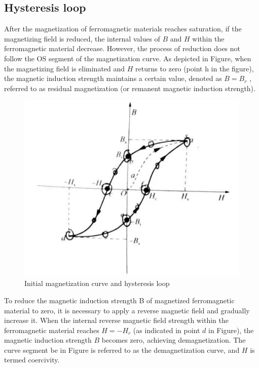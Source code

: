 \documentclass[UTF8]{article}
\begin{document}
   \subsection{Hysteresis loop}
   After the magnetization of ferromagnetic materials reaches saturation, if the magnetizing field is reduced, the internal values of $B$ and $H$ within the ferromagnetic material decrease. However, the process of reduction does not follow the OS segment of the magnetization curve. As depicted in Figure, when the magnetizing field is eliminated and $H$ returns to zero (point h in the figure), the magnetic induction strength maintains a certain value, denoted as $B = B_r$ , referred to as residual magnetization (or remanent magnetic induction strength).
   
   \begin{figure}[H]
   	    	\centering
   	    	\includegraphics[clip,scale=0.9,trim={0 0 0 0}]{fig/fig4.png}
   	        \caption{Initial magnetization curve and hysteresis loop}
   	        \label{figure.1}
       \end{figure}  
   
   To reduce the magnetic induction strength B of magnetized ferromagnetic material to zero, it is necessary to apply a reverse magnetic field and gradually increase it. When the internal reverse magnetic field strength within the ferromagnetic material reaches $H = -H_c$ (as indicated in point $d$ in Figure), the magnetic induction strength $B$ becomes zero, achieving demagnetization. The curve segment be in Figure is referred to as the demagnetization curve, and $H$ is termed coercivity.
   
\end{document}
